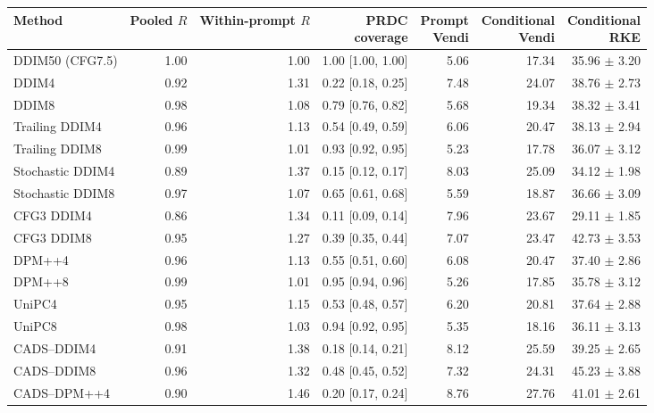 \begin{table}[t]
\centering\footnotesize
\setlength{\tabcolsep}{4pt}
\begin{tabular}{lrrrrrr}
\toprule
Method & \shortstack{Pooled\\$R$} & \shortstack{Within-prompt\\$R$} & \shortstack{PRDC\\coverage} & \shortstack{Prompt\\Vendi} & \shortstack{Conditional\\Vendi} & \shortstack{Conditional\\RKE} \\
\midrule
DDIM50 (CFG7.5) & 1.00 & 1.00 & 1.00 [1.00, 1.00] & 5.06 & 17.34 & 35.96 $\pm$ 3.20 \\
DDIM4 & 0.92 & 1.31 & 0.22 [0.18, 0.25] & 7.48 & 24.07 & 38.76 $\pm$ 2.73 \\
DDIM8 & 0.98 & 1.08 & 0.79 [0.76, 0.82] & 5.68 & 19.34 & 38.32 $\pm$ 3.41 \\
Trailing DDIM4 & 0.96 & 1.13 & 0.54 [0.49, 0.59] & 6.06 & 20.47 & 38.13 $\pm$ 2.94 \\
Trailing DDIM8 & 0.99 & 1.01 & 0.93 [0.92, 0.95] & 5.23 & 17.78 & 36.07 $\pm$ 3.12 \\
Stochastic DDIM4 & 0.89 & 1.37 & 0.15 [0.12, 0.17] & 8.03 & 25.09 & 34.12 $\pm$ 1.98 \\
Stochastic DDIM8 & 0.97 & 1.07 & 0.65 [0.61, 0.68] & 5.59 & 18.87 & 36.66 $\pm$ 3.09 \\
CFG3 DDIM4 & 0.86 & 1.34 & 0.11 [0.09, 0.14] & 7.96 & 23.67 & 29.11 $\pm$ 1.85 \\
CFG3 DDIM8 & 0.95 & 1.27 & 0.39 [0.35, 0.44] & 7.07 & 23.47 & 42.73 $\pm$ 3.53 \\
DPM++4 & 0.96 & 1.13 & 0.55 [0.51, 0.60] & 6.08 & 20.47 & 37.40 $\pm$ 2.86 \\
DPM++8 & 0.99 & 1.01 & 0.95 [0.94, 0.96] & 5.26 & 17.85 & 35.78 $\pm$ 3.12 \\
UniPC4 & 0.95 & 1.15 & 0.53 [0.48, 0.57] & 6.20 & 20.81 & 37.64 $\pm$ 2.88 \\
UniPC8 & 0.98 & 1.03 & 0.94 [0.92, 0.95] & 5.35 & 18.16 & 36.11 $\pm$ 3.13 \\
CADS--DDIM4 & 0.91 & 1.38 & 0.18 [0.14, 0.21] & 8.12 & 25.59 & 39.25 $\pm$ 2.65 \\
CADS--DDIM8 & 0.96 & 1.32 & 0.48 [0.45, 0.52] & 7.32 & 24.31 & 45.23 $\pm$ 3.88 \\
CADS--DPM++4 & 0.90 & 1.46 & 0.20 [0.17, 0.24] & 8.76 & 27.76 & 41.01 $\pm$ 2.61 \\

\end{tabular}
\end{table}

